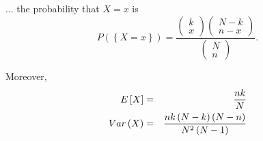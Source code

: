 \documentclass[smaller]{beamer}\usepackage[]{graphicx}\usepackage[]{color}
\renewcommand{\Pr}{P}
\begin{document}
\begin{frame}{\secname}

  \begin{definition}[cont'd]
  ... the probability that $X=x$ is
  \begin{equation*}
  \Pr (\left\{ X=x\right\}) =\frac{\left(
  \begin{array}{c}
  k \\
  x%
  \end{array}%
  \right) \left(
  \begin{array}{c}
  N-k \\
  n-x%
  \end{array}%
  \right) }{\left(
  \begin{array}{c}
  N \\
  n%
  \end{array}%
  \right) }.
  \end{equation*}
  \end{definition}

  Moreover,
  \begin{eqnarray*}
  E\left[ X\right] &=&\frac{nk}{N} \\
  Var\left( X\right) &=&\frac{nk\left( N-k\right) \left( N-n\right) }{%
  N^{2}\left( N-1\right) }
  \end{eqnarray*}
\end{frame}
\end{document}
